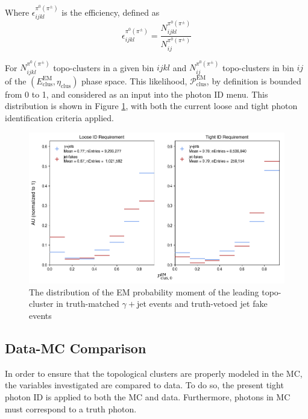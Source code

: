 Where $\epsilon^{\pi^0(\pi^\pm)}_{ijkl}$ is the efficiency, defined as
\begin{equation}
    \epsilon^{\pi^0(\pi^\pm)}_{ijkl} = \frac{ N^{\pi^0(\pi^\pm)}_{ijkl} }{N^{\pi^0(\pi^\pm)}_{ij}}
\end{equation}

For $N^{\pi^0(\pi^\pm)}_{ijkl}$ topo-clusters in a given bin $ijkl$ and $N^{\pi^0(\pi^\pm)}_{ij}$ topo-clusters in bin $ij$ of the $(E_{\text{clus}}^{\text{EM}}, \eta_{\text{clus}})$ phase space. This likelihood, $\mathcal{P}_{\text{clus}}^{\text{EM}}$, by definition is bounded from 0 to 1, and considered as an input into the photon ID menu. This distribution is shown in Figure \ref{fig:topo-emProb}, with both the current loose and tight photon identification criteria applied.

\begin{figure}[!thp]
    \centering 
    \includegraphics[width=.9\textwidth]{chapters/chapter4_photonID/images/hists/y_topoCluster0_emProbability.png}
    \caption[The distribution of the \gls{EM} probability moment of the leading topo-cluster]{The distribution of the \gls{EM} probability moment of the leading topo-cluster in truth-matched $\gamma+$jet events and truth-vetoed jet fake events}
    \label{fig:topo-emProb}
\end{figure}


\subsection{Data-MC Comparison}
In order to ensure that the topological clusters are properly modeled in the \gls{MC}, the variables investigated are compared to data. To do so, the present tight photon ID is applied to both the \gls{MC} and data. Furthermore, photons in \gls{MC} must correspond to a truth photon. 


